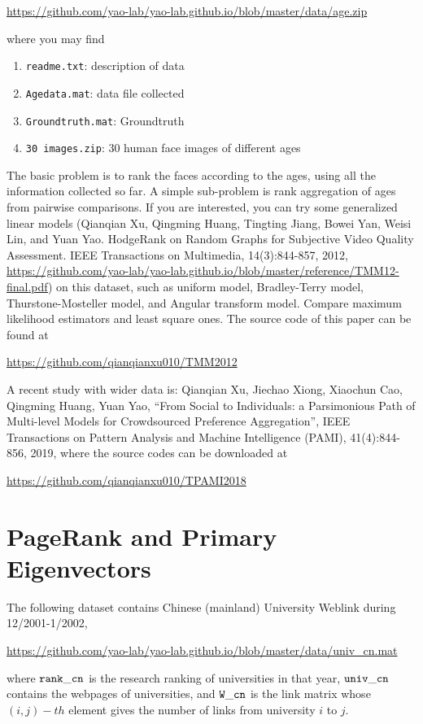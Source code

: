 \documentclass[11pt]{article}
\begin{document}
\url{https://github.com/yao-lab/yao-lab.github.io/blob/master/data/age.zip}

\noindent where you may find
\begin{enumerate}
\item \texttt{readme.txt}: description of data
\item \texttt{Agedata.mat}: data file collected
\item \texttt{Groundtruth.mat}: Groundtruth
\item \texttt{30 images.zip}: 30 human face images of different ages
\end{enumerate}

The basic problem is to rank the faces according to the ages, using all the information collected so far. A simple sub-problem is rank aggregation of ages from pairwise comparisons. If you are interested, you can try some generalized linear models (Qianqian Xu, Qingming Huang, Tingting Jiang, Bowei Yan, Weisi Lin, and Yuan Yao. HodgeRank on Random Graphs for Subjective Video Quality Assessment. IEEE Transactions on Multimedia, 14(3):844-857, 2012, \url{https://github.com/yao-lab/yao-lab.github.io/blob/master/reference/TMM12-final.pdf}) on this dataset, such as uniform model, Bradley-Terry model, Thurstone-Mosteller model, and Angular transform model. Compare maximum likelihood estimators and least square ones. The source code of this paper can be found at

\url{https://github.com/qianqianxu010/TMM2012} 

A recent study with wider data is: Qianqian Xu, Jiechao Xiong, Xiaochun Cao, Qingming Huang, Yuan Yao, “From Social to Individuals: a Parsimonious Path of Multi-level Models for Crowdsourced Preference Aggregation”, IEEE Transactions on Pattern Analysis and Machine Intelligence (PAMI), 41(4):844-856, 2019, where the source codes can be downloaded at

\url{https://github.com/qianqianxu010/TPAMI2018}

\section{PageRank and Primary Eigenvectors}

The following dataset contains Chinese (mainland) University Weblink during 12/2001-1/2002,

\url{https://github.com/yao-lab/yao-lab.github.io/blob/master/data/univ_cn.mat}

\noindent where $\tt{rank\_{}cn}$ is the research ranking of universities in that year, $\tt{univ\_{}cn}$ contains the webpages of universities, and $\tt{W\_{}cn}$ is the link matrix whose $(i,j)-th$ element gives the number of links from university
$i$ to $j$. 
 
\end{document}
